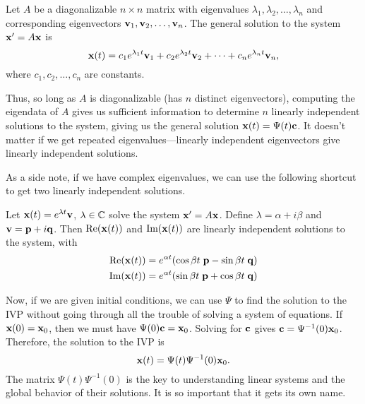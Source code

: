 \documentclass[../m082main.tex]{subfiles}
\begin{document}
\begin{theorem}
    Let $A$ be a diagonalizable $n \times n$ matrix with eigenvalues $\lambda_1, \lambda_2, \ldots, \lambda_n$ and corresponding eigenvectors $\mathbf{v}_1, \mathbf{v}_2, \ldots, \mathbf{v}_n$.
    The general solution to the system $\mathbf{x}' = A \mathbf{x}$ is
    \[ \mathbf{x}(t) = c_1 e^{\lambda_1 t} \mathbf{v}_1 + c_2e^{\lambda_2 t} \mathbf{v}_2 + \cdots + c_n e^{\lambda_n t} \mathbf{v}_n, \]
    where $c_1, c_2, \ldots, c_n$ are constants.
\end{theorem}

Thus, so long as $A$ is diagonalizable (has $n$ distinct eigenvectors), computing the eigendata of $A$ gives us sufficient information to determine $n$ linearly independent solutions to the system, giving us the general solution $\mathbf{x}(t) = \Psi (t) \mathbf{c}$.
It doesn't matter if we get repeated eigenvalues---linearly independent eigenvectors give linearly independent solutions.

As a side note, if we have complex eigenvalues, we can use the following shortcut to get two linearly independent solutions.

\begin{theorem}
    Let $\mathbf{x}(t) = e^{\lambda t} \mathbf{v}$, $\lambda \in \mathbb{C}$ solve the system $\mathbf{x}' = A \mathbf{x}$.
    Define $\lambda = \alpha + i\beta$ and $\mathbf{v} = \mathbf{p} + i\mathbf{q}$.
    Then $\textrm{Re} (\mathbf{x}(t))$ and $\textrm{Im} (\mathbf{x}(t))$ are linearly independent solutions to the system, with
    \begin{align*}
        \textrm{Re}(\mathbf{x}(t)) &= e^{\alpha t} (\cos \beta t \; \mathbf{p} - \sin \beta t \; \mathbf{q}) \\
        \textrm{Im}(\mathbf{x}(t)) &= e^{\alpha t} (\sin \beta t \; \mathbf{p} + \cos \beta t \; \mathbf{q})
    \end{align*}
\end{theorem}

Now, if we are given initial conditions, we can use $\Psi$ to find the solution to the IVP without going through all the trouble of solving a system of equations.
If $\mathbf{x}(0) = \mathbf{x}_0$, then we must have $\Psi (0) \mathbf{c} = \mathbf{x}_0$.
Solving for $\mathbf{c}$ gives $\mathbf{c} = \Psi^{-1}(0) \mathbf{x}_0$.
Therefore, the solution to the IVP is
\[ \mathbf{x}(t) = \Psi(t) \Psi^{-1}(0) \mathbf{x}_0. \]
The matrix $\Psi(t) \Psi^{-1}(0)$ is the key to understanding linear systems and the global behavior of their solutions.
It is so important that it gets its own name.
\end{document}
